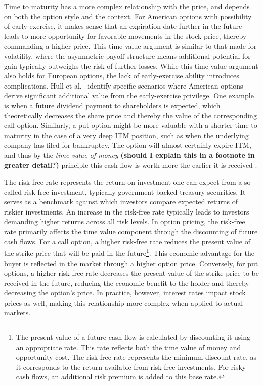 \documentclass[english,12pt,a4paper,pdftex,sci,utf8]{aaltothesis}
\begin{document}
Time to maturity has a more complex relationship with the price, and depends on both the option style and the context. For American options with possibility of early-exercise, it makes sense that an expiration date further in the future leads to more opportunity for favorable movements in the stock price, thereby commanding a higher price. This time value argument is similar to that made for volatility, where the asymmetric payoff structure means additional potential for gain typically outweighs the risk of further losses. While this time value argument also holds for European options, the lack of early-exercise ability introduces complications. Hull et al.\ \cite{hull2013fundamentals} identify specific scenarios where American options derive significant additional value from the early-exercise privilege. One example is when a future dividend payment to shareholders is expected, which theoretically decreases the share price and thereby the value of the corresponding call option. Similarly, a put option might be more valuable with a shorter time to maturity in the case of a very deep ITM position, such as when the underlying company has filed for bankruptcy. The option will almost certainly expire ITM, and thus by the \emph{time value of money} \textbf{(should I explain this in a footnote in greater detail?)} principle this cash flow is worth more the earlier it is received \cite{berk2007corporate}.

The risk-free rate represents the return on investment one can expect from a so-called risk-free investment, typically government-backed treasury securities. It serves as a benchmark against which investors compare expected returns of riskier investments. An increase in the risk-free rate typically leads to investors demanding higher returns across all risk levels. In option pricing, the risk-free rate primarily affects the time value component through the discounting of future cash flows. For a call option, a higher risk-free rate reduces the present value of the strike price that will be paid in the future\footnote{The present value of a future cash flow is calculated by discounting it using an appropriate rate. This rate reflects both the time value of money and opportunity cost. The risk-free rate represents the minimum discount rate, as it corresponds to the return available from risk-free investments. For risky cash flows, an additional risk premium is added to this base rate.}. This economic advantage for the buyer is reflected in the market through a higher option price. Conversely, for put options, a higher risk-free rate decreases the present value of the strike price to be received in the future, reducing the economic benefit to the holder and thereby decreasing the option's price. In practice, however, interest rates impact stock prices as well, making this relationship more complex when applied to actual markets.
\end{document}
